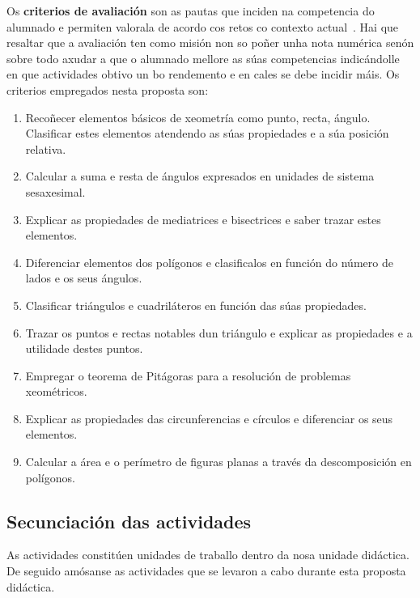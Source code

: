Os \textbf{criterios de avaliación} son as pautas que inciden na competencia do alumnado e permiten valorala de acordo cos retos co contexto actual~\cite[p. 134]{secdidac}. Hai que resaltar que a avaliación ten como misión non so poñer unha nota numérica senón sobre todo axudar a que o alumnado mellore as súas competencias indicándolle en que actividades obtivo un bo rendemento e en cales se debe incidir máis. Os criterios empregados nesta proposta son:

\begin{enumerate}[label=\bfseries Cri\arabic*]
  \item\label{cri1} Recoñecer elementos básicos de xeometría como punto, recta, ángulo. Clasificar estes elementos atendendo as súas propiedades e a súa posición relativa.
  \item\label{cri2} Calcular a suma e resta de ángulos expresados en unidades de sistema sesaxesimal.
  \item\label{cri3} Explicar as propiedades de mediatrices e bisectrices e saber trazar estes elementos.
  \item\label{cri4} Diferenciar elementos dos polígonos e clasificalos en función do número de lados e os seus ángulos.
  \item\label{cri5} Clasificar triángulos e cuadriláteros en función das súas propiedades.
  \item\label{cri6} Trazar os puntos e rectas notables dun triángulo e explicar as propiedades e a utilidade destes puntos.
  \item\label{cri7} Empregar o teorema de Pitágoras para a resolución de problemas xeométricos.
  \item\label{cri8} Explicar as propiedades das circunferencias e círculos e diferenciar os seus elementos.
  \item\label{cri9} Calcular a área e o perímetro de figuras planas a través da descomposición en polígonos.
\end{enumerate}


\subsection{Secunciación das actividades}

As actividades constitúen unidades de traballo dentro da nosa unidade didáctica. De seguido amósanse as actividades que se levaron a cabo durante esta proposta didáctica.


